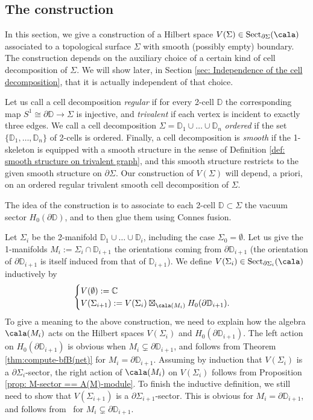 \documentclass[a4paper,10pt,leqno]{amsart}
\newcommand{\lemNNN}{Lem.~3.30}
\newcommand{\IC}{\mathbb{C}}     \newcommand{\calc}{\mathcal{C}}
\newcommand{\ID}{\mathbb{D}}     \newcommand{\cald}{\mathcal{D}}
\theoremstyle{plain}
\theoremstyle{definition}
\theoremstyle{remark}
\DeclareMathOperator{\Rep}{Sect}
\begin{document}
\subsection{The construction}\label{sec: The Hilbert space associated to a surface}



In this section, we give a construction of a Hilbert space $V(\Sigma)\in\Rep_{\partial\Sigma}(\cala)$
associated to a topological surface $\Sigma$ with smooth (possibly empty) boundary.
The construction depends on the auxiliary choice of a certain kind of cell decomposition of $\Sigma$.
We will show later, in Section \ref{sec: Independence of the cell decomposition}, that it is actually independent of that choice.

Let us call a cell decomposition \emph{regular} if for every 2-cell $\ID$ the corresponding map $S^1\cong\partial \ID\to \Sigma$ is injective,
and \emph{trivalent} if each vertex is incident to exactly three edges.
We call a cell decomposition $\Sigma=\ID_1\cup\ldots\cup\ID_n$ \emph{ordered} if the set $\{\ID_1,\ldots,\ID_n\}$ of 2-cells is ordered.
Finally, a cell decomposition is \emph{smooth} if the 1-skeleton is equipped with a smooth structure in the sense of Definition \ref{def: smooth structure on trivalent graph},
and this smooth structure restricts to the given smooth structure on $\partial \Sigma$.
Our construction of $V(\Sigma)$ will depend, a priori, on an ordered regular trivalent smooth cell decomposition of $\Sigma$.

The idea of the construction is to associate to each 2-cell $\ID\subset \Sigma$ the vacuum sector $H_0(\partial \ID)$, and to then glue them using Connes fusion.

Let $\Sigma_i$ be the 2-manifold $\ID_1\cup\ldots\cup\ID_i$, including the case $\Sigma_0=\emptyset$.
Let us give the 1-manifolds $M_i:=\Sigma_i\cap\ID_{i+1}$ the orientations coming from $\partial \ID_{i+1}$
(the orientation of $\partial\ID_{i+1}$ is itself induced from that of $\ID_{i+1}$).
We define $V(\Sigma_i)\in\Rep_{\partial \Sigma_i}(\cala)$ inductively by
\begin{equation}\label{eq: V(D_i) -- BIS}
\begin{cases} V(\emptyset):=\IC\\
V(\Sigma_{i+1}):= V(\Sigma_i)\boxtimes_{\cala(M_i)}H_0(\partial \ID_{i+1}).
\end{cases}
\end{equation}
To give a meaning to the above construction,
we need to explain how the algebra $\cala(M_i)$ acts on the Hilbert spaces $V(\Sigma_i)$ and $H_0(\partial \ID_{i+1})$.
The left action on $H_0(\partial \ID_{i+1})$ is obvious when $M_i\subsetneq \partial \ID_{i+1}$, and follows from Theorem \ref{thm:compute-bfB(net)} for $M_i= \partial \ID_{i+1}$.
Assuming by induction that $V(\Sigma_i)$ is a $\partial \Sigma_i$-sector,
the right action of $\cala(M_i)$ on $V(\Sigma_i)$ follows from Proposition \ref{prop: M-sector == A(M)-module}.
To finish the inductive definition, we still need to show that $V(\Sigma_{i+1})$ is a $\partial \Sigma_{i+1}$-sector.
This is obvious for $M_i= \partial \ID_{i+1}$, and follows 
from~\cite[\lemNNN]{BDH(nets)} for $M_i\subsetneq \partial \ID_{i+1}$.
\end{document}
